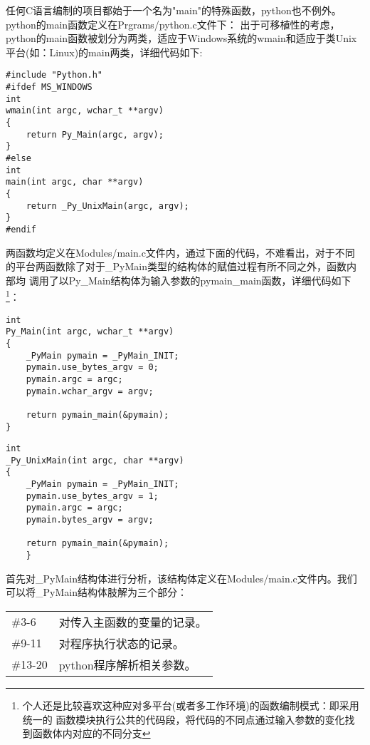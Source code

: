 \documentclass[UTF8]{book}
\begin{document}
任何C语言编制的项目都始于一个名为"main"的特殊函数，python也不例外。python的main函数定义在Prgrams/python.c文件下：
出于可移植性的考虑，python的main函数被划分为两类，适应于Windows系统的wmain和适应于类Unix平台(如：Linux)的main两类，详细代码如下:\par
\begin{lstlisting}[language={[ANSI]C}]
#include "Python.h"
#ifdef MS_WINDOWS
int
wmain(int argc, wchar_t **argv)
{
    return Py_Main(argc, argv);
}
#else
int
main(int argc, char **argv)
{
    return _Py_UnixMain(argc, argv);
}
#endif
\end{lstlisting}\par
两函数均定义在Modules/main.c文件内，通过下面的代码，不难看出，对于不同的平台两函数除了对于\_PyMain类型的结构体的赋值过程有所不同之外，函数内部均
调用了以Py\_Main结构体为输入参数的pymain\_main函数，详细代码如下\footnote{个人还是比较喜欢这种应对多平台(或者多工作环境)的函数编制模式：即采用统一的
函数模块执行公共的代码段，将代码的不同点通过输入参数的变化找到函数体内对应的不同分支}：
\begin{lstlisting}[language={[ANSI]C}]
int
Py_Main(int argc, wchar_t **argv)
{
    _PyMain pymain = _PyMain_INIT;
    pymain.use_bytes_argv = 0;
    pymain.argc = argc;
    pymain.wchar_argv = argv;
    
    return pymain_main(&pymain);
}
\end{lstlisting}
\newpage
\begin{lstlisting}
int
_Py_UnixMain(int argc, char **argv)
{
    _PyMain pymain = _PyMain_INIT;
    pymain.use_bytes_argv = 1;
    pymain.argc = argc;
    pymain.bytes_argv = argv;
    
    return pymain_main(&pymain);
    }
\end{lstlisting}\par
首先对\_PyMain结构体进行分析，该结构体定义在Modules/main.c文件内。我们可以将\_PyMain结构体肢解为三个部分：\par
\begin{tabular*}{8cm}{ll}  
\#3-6 & 对传入主函数的变量的记录。\\
\#9-11& 对程序执行状态的记录。\\
\#13-20& python程序解析相关参数。\\
\end{tabular*}  
\end{document}
